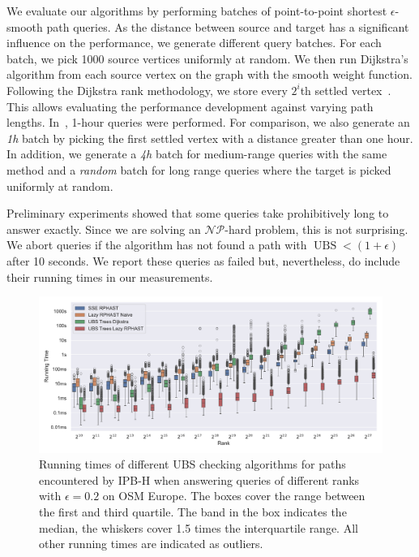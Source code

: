 \documentclass[a4paper,UKenglish,cleveref, autoref, thm-restate]{lipics-v2021}
\newcommand*{\ubs}{\operatorname{UBS}}
\begin{document}
We evaluate our algorithms by performing batches of point-to-point shortest $\epsilon$-smooth path queries.
As the distance between source and target has a significant influence on the performance, we generate different query batches.
For each batch, we pick 1000 source vertices uniformly at random.
We then run Dijkstra's algorithm from each source vertex on the graph with the smooth weight function.
Following the Dijkstra rank methodology, we store every $2^i$th settled vertex~\cite{ss-hhhes-05}.
This allows evaluating the performance development against varying path lengths.
In~\cite{adgw-arrn-13}, 1-hour queries were performed.
For comparison, we also generate an \emph{1h} batch by picking the first settled vertex with a distance greater than one hour.
In addition, we generate a \emph{4h} batch for medium-range queries with the same method and a \emph{random} batch for long range queries where the target is picked uniformly at random.

Preliminary experiments showed that some queries take prohibitively long to answer exactly.
Since we are solving an $\mathcal{NP}$-hard problem, this is not surprising.
We abort queries if the algorithm has not found a path with $\ubs < (1+\epsilon)$ after 10 seconds.
We report these queries as failed but, nevertheless, do include their running times in our measurements.

\begin{figure}
\centering
\includegraphics[width=\linewidth]{fig/ubs_perf.pdf}
\caption{
Running times of different UBS checking algorithms for paths encountered by IPB-H when answering queries of different ranks with $\epsilon = 0.2$ on OSM Europe.
The boxes cover the range between the first and third quartile.
The band in the box indicates the median, the whiskers cover 1.5 times the interquartile range.
All other running times are indicated as outliers.
}\label{fig:ubs_perf}
\end{figure}
\end{document}
